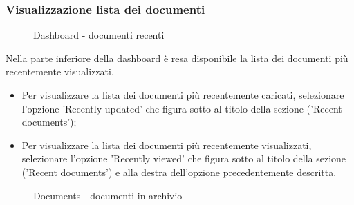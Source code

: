 \documentclass[10pt, a4paper]{article}
\begin{document}
\subsubsection{Visualizzazione lista dei documenti}
\label{sec:visDocsList}
\begin{figure}[H]
    \centering  
    \caption{Dashboard - documenti recenti}
    \label{img:dashRecentDocs}
\end{figure}
Nella parte inferiore della dashboard è resa disponibile la lista dei documenti più recentemente visualizzati.
    \begin{itemize}
        \item Per visualizzare la lista dei documenti più recentemente caricati, selezionare l'opzione 'Recently updated' che figura sotto al titolo della sezione ('Recent documents');
        \item Per visualizzare la lista dei documenti più recentemente visualizzati, selezionare l'opzione 'Recently viewed' che figura sotto al titolo della sezione ('Recent documents') e alla destra dell'opzione precedentemente descritta.
    \end{itemize}
    \begin{figure}[H]
        \centering  
        \caption{Documents - documenti in archivio}
        \label{img:docssaved}
    \end{figure}
\end{document}
